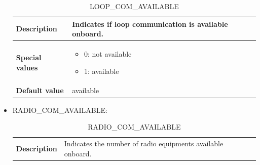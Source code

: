 \documentclass{template/openetcs}
\begin{document}
\begin{itemize}
			\begin{longtable}{|l|l|}
				\caption{LOOP\_COM\_AVAILABLE}\\ 
				\hline
				
					\begin{minipage}[t]{0.22\linewidth} \textbf{Description}	\end{minipage} 
				&	\begin{minipage}[t]{0.78\linewidth} Indicates if loop communication is available onboard. \end{minipage} \\
				
				\hline
																																									
					\begin{minipage}[t]{0.22\linewidth} \textbf{Special values}	\end{minipage} 
				&	\begin{minipage}[t]{0.78\linewidth} \begin{itemize} \item 0: not available \item 1: available \end{itemize} \end{minipage} \\
				
				\hline
				
					\begin{minipage}[t]{0.22\linewidth} \textbf{Default value}	\end{minipage} 
				&	\begin{minipage}[t]{0.78\linewidth} available \end{minipage} \\
				
				\hline
				
			\end{longtable}
			
		\item RADIO\_COM\_AVAILABLE:
				
			\begin{longtable}{|l|l|}
				\caption{RADIO\_COM\_AVAILABLE}\\ 
				\hline
				
					\begin{minipage}[t]{0.22\linewidth} \textbf{Description}	\end{minipage} 
				&	\begin{minipage}[t]{0.78\linewidth} Indicates the number of radio equipments available onboard. \end{minipage} \\
				

\end{longtable}
\end{itemize}
\end{document}
